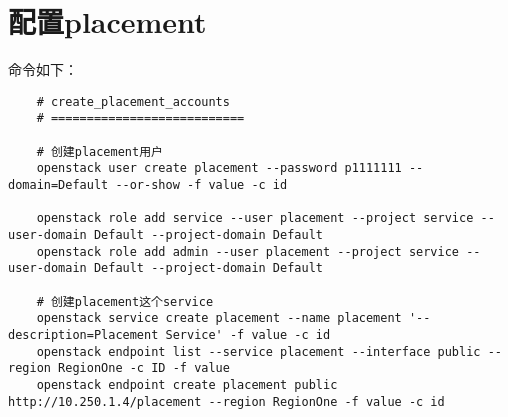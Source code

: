 \documentclass[a4paper,left=1.5cm,right=1.5cm,11pt]{article}
\begin{document}
\section{配置placement}
	命令如下：
	\begin{lstlisting}
	# create_placement_accounts
	# ===========================

	# 创建placement用户
	openstack user create placement --password p1111111 --domain=Default --or-show -f value -c id
	
	openstack role add service --user placement --project service --user-domain Default --project-domain Default
	openstack role add admin --user placement --project service --user-domain Default --project-domain Default

	# 创建placement这个service
	openstack service create placement --name placement '--description=Placement Service' -f value -c id
	openstack endpoint list --service placement --interface public --region RegionOne -c ID -f value
	openstack endpoint create placement public http://10.250.1.4/placement --region RegionOne -f value -c id
	\end{lstlisting}
\end{document}
